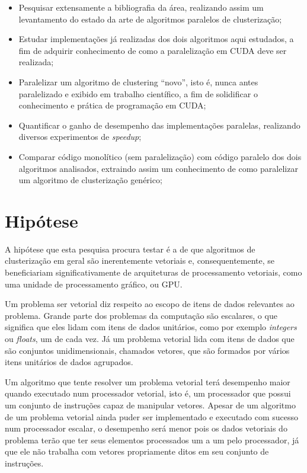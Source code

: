 \documentclass[12pt, %
openright, 
oneside, %
a4paper,    %
brazil]{facom-ufu-abntex2}
\def\qntAlgrtm{dois}
\begin{document}
\begin{itemize}
    \item Pesquisar extensamente a bibliografia da área, realizando assim um levantamento do estado da arte de algoritmos paralelos de clusterização;
    \item Estudar implementações já realizadas dos \qntAlgrtm{} algoritmos aqui estudados, a fim de adquirir conhecimento de como a paralelização em CUDA deve ser realizada;
    \item Paralelizar um algoritmo de clustering \enquote{novo}, isto é, nunca antes paralelizado e exibido em trabalho científico, a fim de solidificar o conhecimento e prática de programação em CUDA;
    \item Quantificar o ganho de desempenho das implementações paralelas, realizando diversos experimentos de \textit{speedup};
    \item Comparar código monolítico (sem paralelização) com código paralelo dos \qntAlgrtm{} algoritmos analisados, extraindo assim um conhecimento de como paralelizar um algoritmo de clusterização genérico;
\end{itemize}





\section{Hipótese}

A hipótese que esta pesquisa procura testar é a de que algoritmos de clusterização em geral são inerentemente vetoriais e, consequentemente, se beneficiariam significativamente de arquiteturas de processamento vetoriais, como uma unidade de processamento gráfico, ou GPU.

Um problema ser vetorial diz respeito ao escopo de itens de dados relevantes ao problema. Grande parte dos problemas da computação são escalares, o que significa que eles lidam com itens de dados unitários, como por exemplo \textit{integers} ou \textit{floats}, um de cada vez. Já um problema vetorial lida com itens de dados que são conjuntos unidimensionais, chamados vetores, que são formados por vários itens unitários de dados agrupados.

Um algoritmo que tente resolver um problema vetorial terá desempenho maior quando executado num processador vetorial, isto é, um processador que possui um conjunto de instruções capaz de manipular vetores. Apesar de um algoritmo de um problema vetorial ainda puder ser implementado e executado com sucesso num processador escalar, o desempenho será menor pois os dados vetoriais do problema terão que ter seus elementos processados um a um pelo processador, já que ele não trabalha com vetores propriamente ditos em seu conjunto de instruções.
\end{document}
